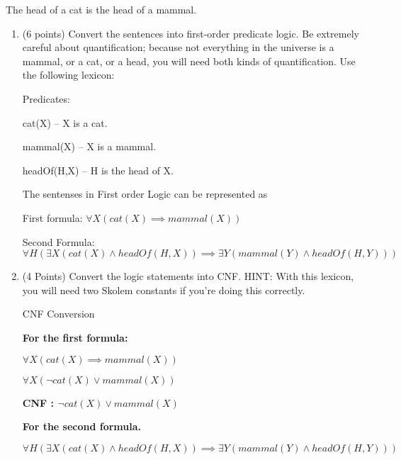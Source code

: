 \documentclass[letterpaper]{article}
\begin{document}
\begin{enumerate}
	The head of a cat is the head of a mammal.

	\begin{enumerate}
		\item (6 points) Convert the sentences into first-order predicate logic. Be
		extremely careful about quantification; because not everything in the 
		universe is a mammal, or a cat, or a head, you will need both kinds of 
		quantification. 
		Use the following lexicon:
	 	
	 	Predicates: 
	 	
	 	cat(X) -- X is a cat.
        
        mammal(X) -- X is a mammal.
        
        headOf(H,X) -- H is the head of X.
        
        \begin{answer}
        	
        	The sentenses in First order Logic can be represented as 
			\bigskip
			        	
        	First formula: 
        	$\forall X (cat(X) \implies mammal(X))$
        	
        	Second Formula: 
        	$\forall H (\exists X (cat(X) \land headOf(H,X)) \implies \exists Y
        	(mammal(Y) \land headOf(H, Y)))$
        	
        	\bigskip
        	
        \end{answer}
        
        \item (4 Points) Convert the logic statements into CNF. HINT: With this
        lexicon, you will need two Skolem constants if you're doing this correctly.
        \begin{answer}
        	
        	CNF Conversion
        	\bigskip
        	
        	\textbf{For the first formula:} 
        	
        	$\forall X (cat(X) \implies mammal(X))$
        	
        	$\forall X (\neg cat(X) \lor mammal(X))$
        	\bigskip
        	
        	\textbf{CNF : $\neg cat(X) \lor mammal(X)$}
        	
        	\bigskip
        	
        	\textbf{For the second formula.}
        	
        	$\forall H (\exists X (cat(X) \land headOf(H,X)) \implies \exists Y
        	(mammal(Y) \land headOf(H, Y)))$
        	

\end{answer}
\end{enumerate}
\end{enumerate}
\end{document}
